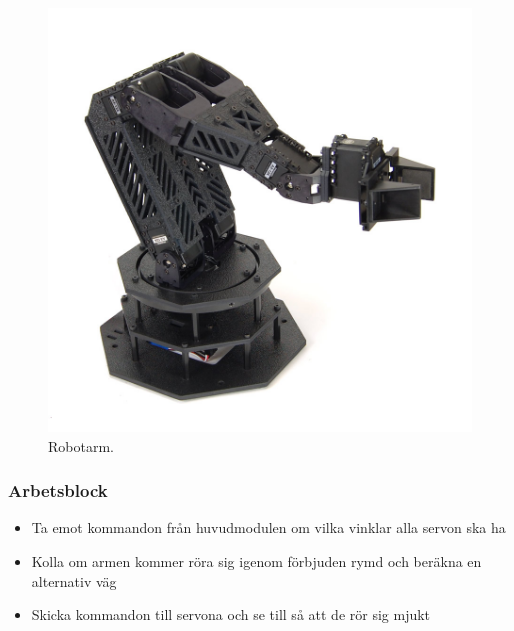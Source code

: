 \begin{figure}[h]
\center
\includegraphics[scale=0.35]{arm}
\caption{Robotarm.}
\end{figure}

\subsubsection{Arbetsblock}

\begin{itemize}
\item Ta emot kommandon från huvudmodulen om vilka vinklar alla servon ska ha
\item Kolla om armen kommer röra sig igenom förbjuden rymd och beräkna en alternativ väg
\item Skicka kommandon till servona och se till så att de rör sig mjukt
\end{itemize}
